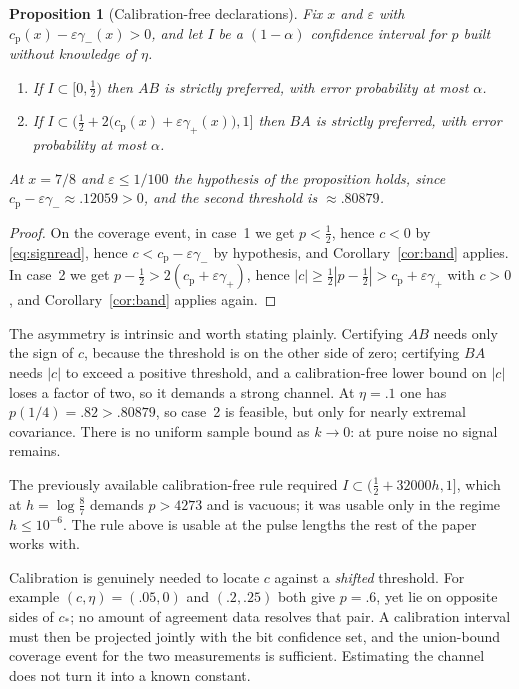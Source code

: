 \documentclass[11pt]{article}
\theoremstyle{plain}
\newtheorem{proposition}[theorem]{Proposition}
\theoremstyle{definition}
\theoremstyle{remark}
\newcommand{\eps}{\varepsilon}
\newcommand{\cp}{c_{\mathrm p}}
\begin{document}
\begin{proposition}[Calibration-free declarations]\label{prop:calfree}
Fix $x$ and $\eps$ with $\cp(x)-\eps\gamma_-(x)>0$, and let $I$ be a
$(1-\alpha)$ confidence interval for $p$ built without knowledge of $\eta$.
\begin{enumerate}[nosep,leftmargin=*]
\item If $I\subset[0,\tfrac12)$ then $AB$ is strictly preferred, with error
      probability at most $\alpha$.
\item If $I\subset\bigl(\tfrac12+2\bigl(\cp(x)+\eps\gamma_+(x)\bigr),1\bigr]$
      then $BA$ is strictly preferred, with error probability at most $\alpha$.
\end{enumerate}
At $x=7/8$ and $\eps\le1/100$ the hypothesis of the proposition holds, since
$\cp-\eps\gamma_-\approx.12059>0$, and the second threshold is
$\approx.80879$.
\end{proposition}

\begin{proof}
On the coverage event, in case~1 we get $p<\tfrac12$, hence $c<0$ by
\eqref{eq:signread}, hence $c<\cp-\eps\gamma_-$ by hypothesis, and
Corollary~\ref{cor:band} applies. In case~2 we get
$p-\tfrac12>2(\cp+\eps\gamma_+)$, hence
$|c|\ge\tfrac12|p-\tfrac12|>\cp+\eps\gamma_+$ with $c>0$, and
Corollary~\ref{cor:band} applies again.
\end{proof}

The asymmetry is intrinsic and worth stating plainly. Certifying $AB$ needs
only the sign of $c$, because the threshold is on the other side of zero;
certifying $BA$ needs $|c|$ to exceed a positive threshold, and a
calibration-free lower bound on $|c|$ loses a factor of two, so it demands a
strong channel. At $\eta=.1$ one has $p(1/4)=.82>.80879$, so case~2 is
feasible, but only for nearly extremal covariance. There is no uniform sample
bound as $k\to0$: at pure noise no signal remains.

The previously available calibration-free rule required
$I\subset(\tfrac12+32000h,1]$, which at $h=\log\frac87$ demands $p>4273$ and is
vacuous; it was usable only in the regime $h\le10^{-6}$. The rule above is
usable at the pulse lengths the rest of the paper works with.

Calibration is genuinely needed to locate $c$ against a \emph{shifted}
threshold. For example $(c,\eta)=(.05,0)$ and $(.2,.25)$ both give $p=.6$, yet
lie on opposite sides of $c_*$; no amount of agreement data resolves that pair.
A calibration interval must then be projected jointly with the bit confidence
set, and the union-bound coverage event for the two measurements is sufficient.
Estimating the channel does not turn it into a known constant.
\end{document}
